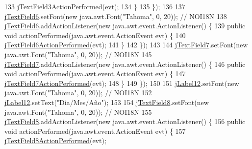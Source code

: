 \begin{DoxyCode}
133                 \mbox{\hyperlink{classsoftware_1_1parasoftware3_a2332853b1533b03c93fb6af67852c214}{jTextField3ActionPerformed}}(evt);
134             \}
135         \});
136 
137         \mbox{\hyperlink{classsoftware_1_1parasoftware3_a38ca1c67c4ebd2265e207c9c76ce72ad}{jTextField6}}.setFont(\textcolor{keyword}{new} java.awt.Font(\textcolor{stringliteral}{"Tahoma"}, 0, 20)); \textcolor{comment}{// NOI18N}
138         \mbox{\hyperlink{classsoftware_1_1parasoftware3_a38ca1c67c4ebd2265e207c9c76ce72ad}{jTextField6}}.addActionListener(\textcolor{keyword}{new} java.awt.event.ActionListener() \{
139             \textcolor{keyword}{public} \textcolor{keywordtype}{void} actionPerformed(java.awt.event.ActionEvent evt) \{
140                 \mbox{\hyperlink{classsoftware_1_1parasoftware3_a146926b0a1a316565b96a3e6d35ad5f9}{jTextField6ActionPerformed}}(evt);
141             \}
142         \});
143 
144         \mbox{\hyperlink{classsoftware_1_1parasoftware3_a32fd4ba8157830b2185c828121e52320}{jTextField7}}.setFont(\textcolor{keyword}{new} java.awt.Font(\textcolor{stringliteral}{"Tahoma"}, 0, 20)); \textcolor{comment}{// NOI18N}
145         \mbox{\hyperlink{classsoftware_1_1parasoftware3_a32fd4ba8157830b2185c828121e52320}{jTextField7}}.addActionListener(\textcolor{keyword}{new} java.awt.event.ActionListener() \{
146             \textcolor{keyword}{public} \textcolor{keywordtype}{void} actionPerformed(java.awt.event.ActionEvent evt) \{
147                 \mbox{\hyperlink{classsoftware_1_1parasoftware3_ada917140604cb8cf60b114f8777da195}{jTextField7ActionPerformed}}(evt);
148             \}
149         \});
150 
151         \mbox{\hyperlink{classsoftware_1_1parasoftware3_abbd12b5ff66390642a8541054290bc50}{jLabel12}}.setFont(\textcolor{keyword}{new} java.awt.Font(\textcolor{stringliteral}{"Tahoma"}, 0, 20)); \textcolor{comment}{// NOI18N}
152         \mbox{\hyperlink{classsoftware_1_1parasoftware3_abbd12b5ff66390642a8541054290bc50}{jLabel12}}.setText(\textcolor{stringliteral}{"Dia/Mes/Año"});
153 
154         \mbox{\hyperlink{classsoftware_1_1parasoftware3_a1be214ec91e03d8a319ac31581cd559f}{jTextField8}}.setFont(\textcolor{keyword}{new} java.awt.Font(\textcolor{stringliteral}{"Tahoma"}, 0, 20)); \textcolor{comment}{// NOI18N}
155         \mbox{\hyperlink{classsoftware_1_1parasoftware3_a1be214ec91e03d8a319ac31581cd559f}{jTextField8}}.addActionListener(\textcolor{keyword}{new} java.awt.event.ActionListener() \{
156             \textcolor{keyword}{public} \textcolor{keywordtype}{void} actionPerformed(java.awt.event.ActionEvent evt) \{
157                 \mbox{\hyperlink{classsoftware_1_1parasoftware3_aef5f7c5d92a7d6c58dfc8ce2fd80da01}{jTextField8ActionPerformed}}(evt);

\end{DoxyCode}
